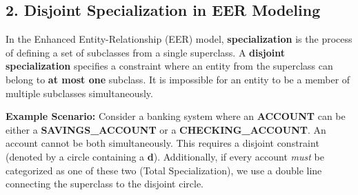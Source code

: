 \documentclass[12pt,a3paper]{article}
\begin{document}
\begin{enumerate}
\begin{tcolorbox}[enhanced,breakable,ansbox,colback=cA!4,colframe=cA,boxrule=0.8pt,arc=5pt,title={\textbf{Answer}},fonttitle=\bfseries\color{white},colbacktitle=cA]
\subsection*{2. Disjoint Specialization in EER Modeling}

In the Enhanced Entity-Relationship (EER) model, \textbf{specialization} is the process of defining a set of subclasses from a single superclass. A \textbf{disjoint specialization} specifies a constraint where an entity from the superclass can belong to \textbf{at most one} subclass. It is impossible for an entity to be a member of multiple subclasses simultaneously.

\textbf{Example Scenario:}
Consider a banking system where an \textbf{ACCOUNT} can be either a \textbf{SAVINGS\_ACCOUNT} or a \textbf{CHECKING\_ACCOUNT}. An account cannot be both simultaneously. This requires a disjoint constraint (denoted by a circle containing a \textbf{d}). Additionally, if every account \textit{must} be categorized as one of these two (Total Specialization), we use a double line connecting the superclass to the disjoint circle.

\vspace{1em}
\begin{center}
\end{center}
\end{tcolorbox}
\end{enumerate}
\end{document}
